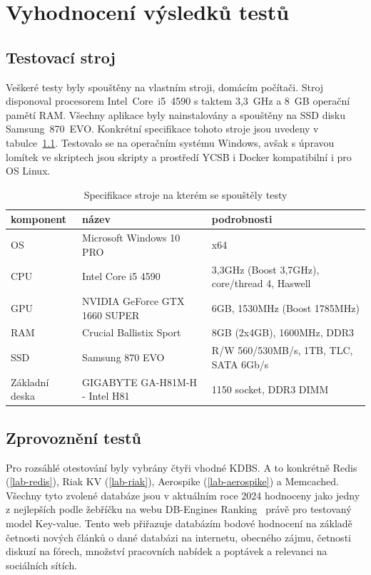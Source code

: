 \documentclass[czech,master,dept460,male,csharp,cpdeclaration]{diploma}
\begin{document}
	\chapter{Vyhodnocení výsledků testů\label{chapter:4-test_results}}
	
	\section{Testovací stroj}
	
	Veškeré testy byly spouštěny na vlastním stroji, domácím počítači. Stroj disponoval procesorem Intel~Core~i5~4590 s taktem 3,3~GHz a 8~GB operační pamětí RAM. Všechny aplikace byly nainstalovány a spouštěny na SSD disku Samsung~870~EVO. Konkrétní specifikace tohoto stroje jsou uvedeny v tabulce~\ref{tab_my_pc_spec}. Testovalo se na operačním systému Windows, avšak s úpravou lomítek ve skriptech jsou skripty a prostředí YCSB i Docker kompatibilní i pro OS Linux.
	
	\begin{table}
	\centering
	\caption{Specifikace stroje na kterém se spouštěly testy\label{tab_my_pc_spec}}
		\begin{tabular}{ l | l | l } 
			\toprule
			komponent & název & podrobnosti \\
			\midrule
			OS & Microsoft Windows 10 PRO & x64 \\
			CPU & Intel Core i5 4590 & 3,3GHz (Boost 3,7GHz), core/thread 4, Haswell\\
			GPU & NVIDIA GeForce GTX 1660 SUPER & 6GB, 1530MHz (Boost 1785MHz) \\
			RAM & Crucial Ballistix Sport & 8GB (2x4GB), 1600MHz, DDR3 \\
			SSD & Samsung 870 EVO & R/W 560/530MB/s, 1TB, TLC, SATA 6Gb/s \\
			Základní deska & GIGABYTE GA-H81M-H - Intel H81 & 1150 socket, DDR3 DIMM \\
			\bottomrule
		\end{tabular}
	\end{table}

	\section{Zprovoznění testů}
	
	Pro rozsáhlé otestování byly vybrány čtyři vhodné KDBS. A to konkrétně Redis (\ref{lab-redis}), Riak KV (\ref{lab-riak}), Aerospike (\ref{lab-aerospike}) a Memcached. Všechny tyto zvolené databáze jsou v aktuálním roce 2024 hodnoceny jako jedny z nejlepších podle žebříčku na webu DB-Engines Ranking~\cite{db-engineers-ranking} právě pro testovaný model Key-value. Tento web přiřazuje databázím bodové hodnocení na základě četnosti nových článků o dané databázi na internetu, obecného zájmu, četnosti diskuzí na fórech, množství pracovních nabídek a poptávek a relevanci na sociálních sítích.
	
\end{document}

